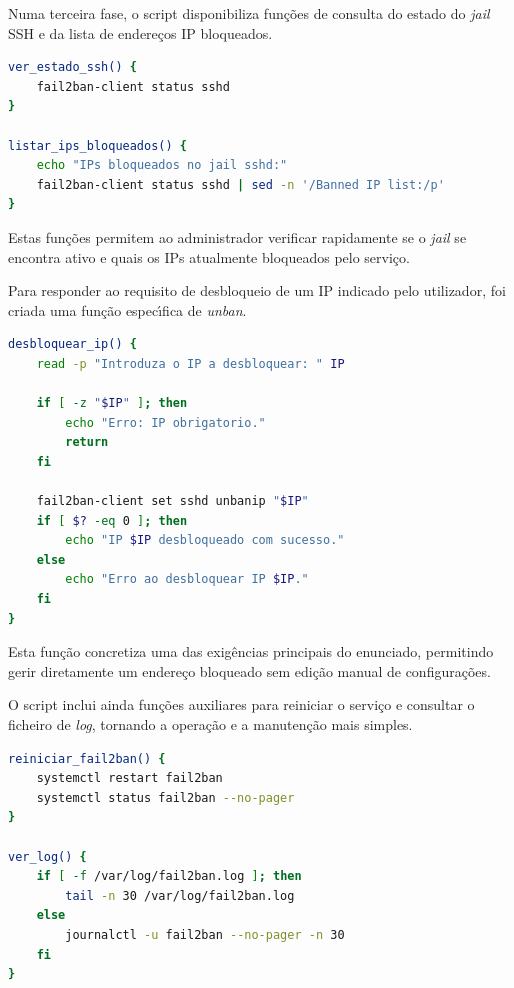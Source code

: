 Numa terceira fase, o script disponibiliza fun\c{c}\~oes de consulta do estado do \textit{jail} SSH e da lista de endere\c{c}os IP bloqueados.

\begin{lstlisting}[language=bash,caption={Consulta do estado do jail e dos IPs bloqueados}]
ver_estado_ssh() {
    fail2ban-client status sshd
}

listar_ips_bloqueados() {
    echo "IPs bloqueados no jail sshd:"
    fail2ban-client status sshd | sed -n '/Banned IP list:/p'
}
\end{lstlisting}

Estas fun\c{c}\~oes permitem ao administrador verificar rapidamente se o \textit{jail} se encontra ativo e quais os IPs atualmente bloqueados pelo servi\c{c}o.

Para responder ao requisito de desbloqueio de um IP indicado pelo utilizador, foi criada uma fun\c{c}\~ao espec\'{\i}fica de \textit{unban}.

\begin{lstlisting}[language=bash,caption={Desbloqueio de um IP indicado pelo utilizador}]
desbloquear_ip() {
    read -p "Introduza o IP a desbloquear: " IP

    if [ -z "$IP" ]; then
        echo "Erro: IP obrigatorio."
        return
    fi

    fail2ban-client set sshd unbanip "$IP"
    if [ $? -eq 0 ]; then
        echo "IP $IP desbloqueado com sucesso."
    else
        echo "Erro ao desbloquear IP $IP."
    fi
}
\end{lstlisting}

Esta fun\c{c}\~ao concretiza uma das exig\^encias principais do enunciado, permitindo gerir diretamente um endere\c{c}o bloqueado sem edi\c{c}\~ao manual de configura\c{c}\~oes.

O script inclui ainda fun\c{c}\~oes auxiliares para reiniciar o servi\c{c}o e consultar o ficheiro de \textit{log}, tornando a opera\c{c}\~ao e a manuten\c{c}\~ao mais simples.

\begin{lstlisting}[language=bash,caption={Reinicio do servico e consulta do log}]
reiniciar_fail2ban() {
    systemctl restart fail2ban
    systemctl status fail2ban --no-pager
}

ver_log() {
    if [ -f /var/log/fail2ban.log ]; then
        tail -n 30 /var/log/fail2ban.log
    else
        journalctl -u fail2ban --no-pager -n 30
    fi
}
\end{lstlisting}


